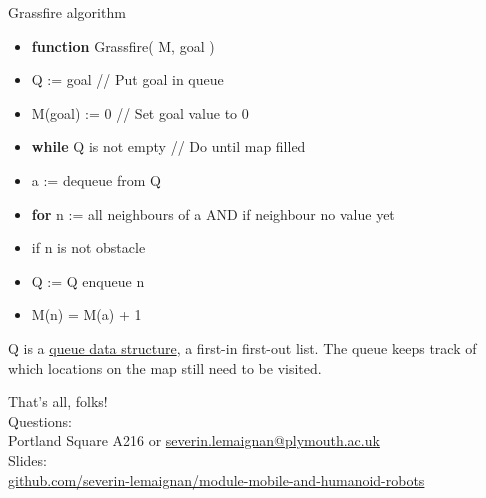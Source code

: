 \documentclass[compress]{beamer}
\begin{document}
\begin{frame}{Grassfire algorithm}

\begin{itemize}
\item \textbf{function} Grassfire( M, goal )
\item Q := goal // Put goal in queue
\item M(goal) := 0 // Set goal value to 0
\item \textbf{while} Q is not empty // Do until map filled
\item a := dequeue from Q
\item \textbf{for} n := \textbf{} all neighbours of a AND if neighbour no
  value yet
\item if n is not obstacle
\item Q := Q enqueue n
\item M(n) = M(a) + 1
\end{itemize}

Q is a
\href{http://en.wikipedia.org/wiki/Queue_(abstract_data_type)}{queue
data structure}, a first-in first-out list. The queue keeps track of
which locations on the map still need to be visited.

\end{frame}


\begin{frame}{}
    \begin{center}
        \Large
        That's all, folks!\\[2em]
        \normalsize
        Questions:\\
        Portland Square A216 or \url{severin.lemaignan@plymouth.ac.uk} \\[1em]

        Slides:\\ \href{https://github.com/severin-lemaignan/module-mobile-and-humanoid-robots}{\small github.com/severin-lemaignan/module-mobile-and-humanoid-robots}

    \end{center}
\end{frame}
\end{document}
